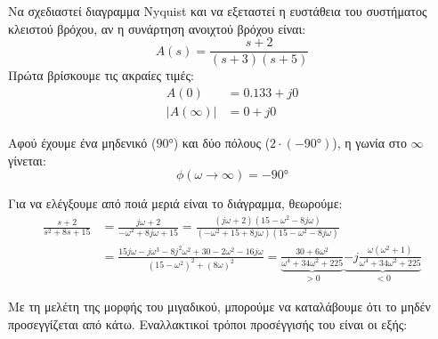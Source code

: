 \documentclass[11pt,a4paper,notitlepage,fleqn,final]{article}
\begin{document}
\begin{exercise}
Να σχεδιαστεί διαγραμμα Nyquist και να εξεταστεί η ευστάθεια του συστήματος κλειστού βρόχου, αν η συνάρτηση ανοιχτού βρόχου είναι:
\[
A(s) = \frac{s+2}{(s+3)(s+5)}
\]
\tcblower
Πρώτα βρίσκουμε τις ακραίες τιμές:
\begin{align*}
	A(0) &= 0.133 + j0 \\
	\left|A(\infty)\right| &= 0 + j0
\end{align*}

Αφού έχουμε ένα μηδενικό (\( \ang{+90} \)) και δύο πόλους (\( 2\cdot(\ang{-90}) \)), η γωνία στο \( \infty \) γίνεται:
\[
\phi(\omega\to\infty) = \ang{-90}
\]

Για να ελέγξουμε από ποιά μεριά είναι το διάγραμμα, θεωρούμε:
\begin{align*}
\frac{s+2}{s^2+8s+15} &= \frac{j\omega+2}{-\omega^2+8j\omega+15} = \frac{(j\omega+2)(15-\omega^2-8j\omega)}{(-\omega^2+15+8j\omega)(15-\omega^2-8j\omega)}\\
&=\frac{15j\omega-j\omega^3-8j^2\omega^2+30-2\omega^2-16j\omega}{(15-\omega^2)^2+(8\omega)^2}
=\underbrace{\frac{30+6\omega^2}{\omega^4+34\omega^2+225}}_{>0}
\underbrace{-j\frac{\omega(\omega^2+1)}{\omega^4+34\omega^2+225}}_{<0}
\end{align*}

Με τη μελέτη της μορφής του μιγαδικού, μπορούμε να καταλάβουμε ότι το μηδέν προσεγγίζεται από κάτω. Εναλλακτικοί τρόποι
προσέγγισής του είναι οι εξής:

\end{exercise}
\end{document}
